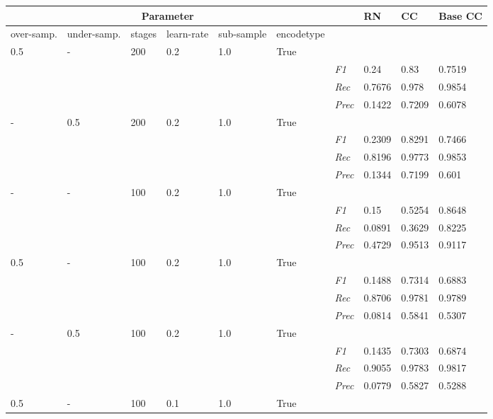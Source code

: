 \begin{table}[]
\tiny
\tabcolsep=0.11cm
\begin{tabularx}{\textwidth}{XXXXXX|X|X|X|X}
\toprule
\multicolumn{6}{c}{Parameter} & & RN &  CC & Base CC \\ \midrule
over-\newline samp. & under-\newline samp. & stages &learn-\newline rate & sub-\newline sample & encode\newline type & & & & \\ \midrule
0.5 & - & 200 & 0.2 & 1.0 &True & & & & \\
& & & & & & \textit{F1} & 0.24 & 0.83   & 0.7519     \\
& & & & & & \textit{Rec} &  0.7676 & 0.978 & 0.9854   \\
& & & & & & \textit{Prec} & 0.1422 & 0.7209 & 0.6078 \\ \midrule
- & 0.5 & 200 & 0.2 & 1.0 &True & & & & \\
& & & & & & \textit{F1} & 0.2309 & 0.8291   & 0.7466     \\
& & & & & & \textit{Rec} &  0.8196 & 0.9773 & 0.9853   \\
& & & & & & \textit{Prec} & 0.1344 & 0.7199 & 0.601 \\ \midrule
- & - & 100 & 0.2 & 1.0 &True & & & & \\
& & & & & & \textit{F1} & 0.15 & 0.5254   & 0.8648     \\
& & & & & & \textit{Rec} &  0.0891 & 0.3629 & 0.8225   \\
& & & & & & \textit{Prec} & 0.4729 & 0.9513 & 0.9117 \\ \midrule
0.5 & - & 100 & 0.2 & 1.0 &True & & & & \\
& & & & & & \textit{F1} & 0.1488 & 0.7314   & 0.6883     \\
& & & & & & \textit{Rec} &  0.8706 & 0.9781 & 0.9789   \\
& & & & & & \textit{Prec} & 0.0814 & 0.5841 & 0.5307 \\ \midrule
- & 0.5 & 100 & 0.2 & 1.0 &True & & & & \\
& & & & & & \textit{F1} & 0.1435 & 0.7303   & 0.6874     \\
& & & & & & \textit{Rec} &  0.9055 & 0.9783 & 0.9817   \\
& & & & & & \textit{Prec} & 0.0779 & 0.5827 & 0.5288 \\ \midrule
0.5 & - & 100 & 0.1 & 1.0 &True & & & & \\

\end{tabularx}
\end{table}
